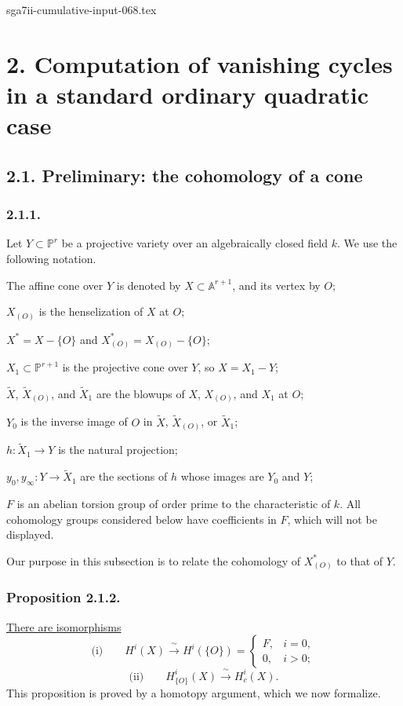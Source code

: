 \begin{filecontents*}{sga7ii-cumulative-input-068.tex}
\section*{2. Computation of vanishing cycles in a standard ordinary
quadratic case}

\subsection*{2.1. Preliminary: the cohomology of a cone}

\subsubsection*{2.1.1.}
Let $Y\subset\mathbb P^r$ be a projective variety over an
algebraically closed field $k$.  We use the following notation.

The affine cone over $Y$ is denoted by
$X\subset\mathbb A^{r+1}$, and its vertex by $O$;

$X_{(O)}$ is the henselization of $X$ at $O$;

$X^*=X-\{O\}$ and $X^*_{(O)}=X_{(O)}-\{O\}$;

$X_1\subset\mathbb P^{r+1}$ is the projective cone over $Y$, so
$X=X_1-Y$;

$\widetilde X$, $\widetilde X_{(O)}$, and $\widetilde X_1$ are the
blowups of $X$, $X_{(O)}$, and $X_1$ at $O$;

$Y_0$ is the inverse image of $O$ in $\widetilde X$,
$\widetilde X_{(O)}$, or $\widetilde X_1$;

$h:\widetilde X_1\to Y$ is the natural projection;

$y_0,y_\infty:Y\to\widetilde X_1$ are the sections of $h$ whose
images are $Y_0$ and $Y$;

$F$ is an abelian torsion group of order prime to the characteristic
of $k$.  All cohomology groups considered below have coefficients in
$F$, which will not be displayed.

Our purpose in this subsection is to relate the cohomology of
$X^*_{(O)}$ to that of $Y$.

\subsubsection*{Proposition 2.1.2.}
\underline{There are isomorphisms}
\[
\text{(i)}\qquad
H^i(X)\xrightarrow{\ \sim\ }H^i(\{O\})=
\begin{cases}
F,& i=0,\\
0,& i>0;
\end{cases}
\]
\[
\text{(ii)}\qquad
H^i_{\{O\}}(X)\xrightarrow{\ \sim\ }H^i_c(X).
\]
This proposition is proved by a homotopy argument, which we now
formalize.


\end{filecontents*}
